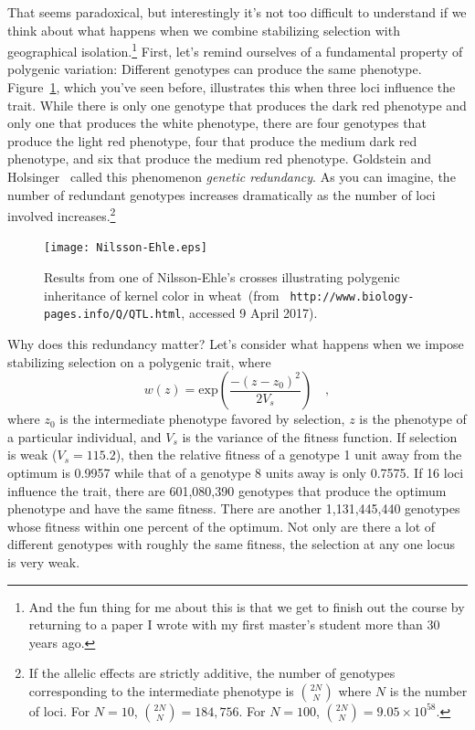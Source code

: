 \documentclass[12pt]{article}
\begin{document}
That seems paradoxical, but interestingly it's not too difficult to
understand if we think about what happens when we combine stabilizing
selection with geographical isolation.\footnote{And the fun thing for
  me about this is that we get to finish out the course by returning
  to a paper I wrote with my first master's student more than 30 years
  ago.} First, let's remind ourselves of a fundamental property of
polygenic variation: Different genotypes can produce the same
phenotype. Figure~\ref{fig:redundancy}, which you've seen before,
illustrates this when three loci influence the trait. While there is
only one genotype that produces the dark red phenotype and only one
that produces the white phenotype, there are four genotypes that
produce the light red phenotype, four that produce the medium dark red
phenotype, and six that produce the medium red phenotype. Goldstein
and Holsinger~\cite{Goldstein-Holsinger-1992} called this phenomenon
{\it genetic redundancy}. As you can
imagine, the number of redundant genotypes increases dramatically as
the number of loci involved increases.\footnote{If the allelic effects
  are strictly additive, the number of genotypes corresponding to the
  intermediate phenotype is $2N \choose N$ where $N$ is the number of
  loci. For $N=10$, ${2N \choose N} = 184,756$. For $N=100$, ${2N \choose
  N} = 9.05 \times 10^{58}$.}

\begin{figure}
  \begin{center}
    \texttt{[image: Nilsson-Ehle.eps]}
  \end{center}
  \caption{Results from one of Nilsson-Ehle's crosses illustrating
    polygenic inheritance of kernel color in wheat~(from {\tt
      http://www.biology-pages.info/Q/QTL.html}, accessed 9 April 2017).}\label{fig:redundancy}
\end{figure}

Why does this redundancy matter? Let's consider what happens when we
impose stabilizing selection on a polygenic trait, where
$$
w(z) = \mbox{exp}\left(\frac{-(z - z_0)^2}{2V_s}\right) \quad ,
$$
where $z_0$ is the intermediate phenotype favored by selection, $z$ is
the phenotype of a particular individual, and $V_s$ is the variance of
the fitness function. If selection is weak ($V_s = 115.2$), then the
relative fitness of a genotype 1 unit away from the optimum is 0.9957
while that of a genotype 8 units away is only 0.7575. If 16 loci
influence the trait, there are 601,080,390 genotypes that produce the
optimum phenotype and have the same fitness. There are another
1,131,445,440 genotypes whose fitness within one percent of the
optimum. Not only are there a lot of different genotypes with roughly
the same fitness, the selection at any one locus is very weak.
\end{document}
